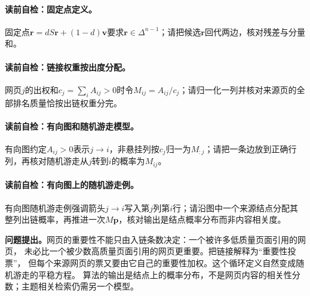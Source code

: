 \paragraph{读前自检：\PageRank{}固定点定义。}\PageRank{}固定点$\boldsymbol r=dS\boldsymbol r+(1-d)\boldsymbol v$要求$\boldsymbol r\in\Delta^{n-1}$；请把候选$\boldsymbol r$回代两边，核对残差与分量和。\par
\paragraph{读前自检：链接权重按出度分配。}网页$j$的出权和$c_j=\sum_iA_{ij}>0$时令$M_{ij}=A_{ij}/c_j$；请归一化一列并核对来源页的全部排名质量恰按出链权重分完。\par
\paragraph{读前自检：有向图和随机游走模型。}有向图约定$A_{ij}>0$表示$j\to i$，非悬挂列按$c_j$归一为$M_{:j}$；请把一条边放到正确行列，再核对随机游走从$j$转到$i$的概率为$M_{ij}$。\par
\paragraph{读前自检：有向图上的随机游走例。}有向图随机游走例强调箭头$j\to i$写入第$j$列第$i$行；请沿图中一个来源结点分配其整列出链概率，再推进一次$M\boldsymbol p$，核对输出是结点概率分布而非内容相关度。\par


\label{struct:V5-C07-CH06}
\textbf{问题提出。}网页的重要性不能只由入链条数决定：一个被许多低质量页面引用的网页，
未必比一个被少数高质量页面引用的网页更重要。\PageRank{}把链接解释为“重要性投票”，
但每个来源网页的票又要由它自己的重要性加权。这个循环定义自然变成随机游走的平稳方程。
算法的输出是结点上的概率分布，不是网页内容的相关性分数；主题相关检索仍需另一个模型。

